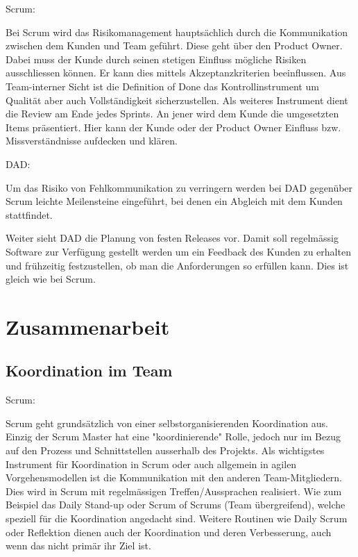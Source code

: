 {\Large Scrum:} \medskip

Bei Scrum wird das Risikomanagement hauptsächlich durch die Kommunikation zwischen dem Kunden und Team geführt. Diese geht über den Product Owner. Dabei muss der Kunde durch seinen stetigen Einfluss mögliche Risiken ausschliessen können. Er kann dies mittels Akzeptanzkriterien beeinflussen.\newline
Aus Team-interner Sicht ist die Definition of Done das Kontrollinstrument um Qualität aber auch Vollständigkeit sicherzustellen.
Als weiteres Instrument dient die Review am Ende jedes Sprints. An jener wird dem Kunde die umgesetzten Items präsentiert. Hier kann der Kunde oder der Product Owner Einfluss bzw. Missverständnisse aufdecken und klären.

\bigskip 

{\Large DAD:} \medskip

Um das Risiko von Fehlkommunikation zu verringern werden bei DAD gegenüber Scrum leichte Meilensteine eingeführt, bei denen ein Abgleich mit dem Kunden stattfindet. \medskip

Weiter sieht DAD die Planung von festen Releases vor. Damit soll regelmässig Software zur Verfügung gestellt werden um ein Feedback des Kunden zu erhalten und frühzeitig festzustellen, ob man die Anforderungen so erfüllen kann. Dies ist gleich wie bei Scrum.

\section{Zusammenarbeit}


\subsection{Koordination im Team}

{\Large Scrum:} \cite{planningReleaseScrum} \medskip

Scrum geht grundsätzlich von einer selbstorganisierenden Koordination aus. Einzig der Scrum Master hat eine "koordinierende" Rolle, jedoch nur im Bezug auf den Prozess und Schnittstellen ausserhalb des Projekts.
Als wichtigstes Instrument für Koordination in Scrum oder auch allgemein in agilen Vorgehensmodellen ist die Kommunikation mit den anderen Team-Mitgliedern. Dies wird in Scrum mit regelmässigen Treffen/Aussprachen realisiert. Wie zum Beispiel das Daily Stand-up oder Scrum of Scrums (Team übergreifend), welche speziell für die Koordination angedacht sind. Weitere Routinen wie Daily Scrum oder Reflektion dienen auch der Koordination und deren Verbesserung, auch wenn das nicht primär ihr Ziel ist.
\bigskip 

